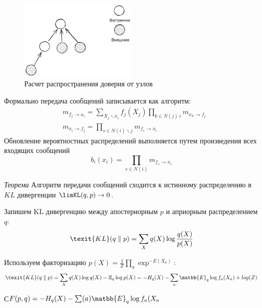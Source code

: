 \begin{figure}[h]
    \centering
    \includegraphics[width=0.5\textwidth]{assets/math/discrete/belief_propogation.excalidraw.png}
    \caption{Расчет распространения доверия от узлов}
    \label{discr_vs_gen}
\end{figure}

Формально передача сообщений записывается как алгоритм:
\begin{equation}
    \begin{aligned}
        &m_{f_j \rightarrow x_i} = \sum_{X_j \backslash x_i} f_j(X_j) \prod_{k\in N(j) \ i} m_{x_k \rightarrow f_j}\\
        &m_{x_i \rightarrow f_j} = \prod_{s \in N(i) \backslash j} m_{f_s \rightarrow x_i}
    \end{aligned}
\end{equation}
Обновление вероятностных распределений выполняется путем произведения всех входящих сообщений 
\begin{equation}
    b_i(x_i) = \prod_{s\in N(i)} m_{f_s \rightarrow x_i}
\end{equation}

\textit{Теорема}\cite{yedidia2000generalized} Алгоритм передачи сообщений сходится к истинному распределению
в $KL$ дивергенции $\limKL(q,p) \rightarrow 0$. 

Запишем $\text{KL}$ дивергенцию между апостериорным $p$ и априорным распределением $q$:
\begin{equation}
    \texit{KL}(q \parallel p)= \sum_{X} q(X) \log \frac{q(X)}{p(X)}
\end{equation}

Используем факторизацию $p(X)= \frac{1}{Z} \prod_a \exp^{-E(X_a)}$:
\begin{equation}
    \texit{KL}(q \parallel p)= \sum_{X} q(X) \log q(X) - \mathbb{E}_q \log p(X) = - H_q(X) - \sum_a \matbb{E}_q \log f_a(X_a) +log(Z)
\end{equation}

С$F(p,q) = - H_q(X) - \sum(a) \matbb{E}_q \log f_a(X_a $


